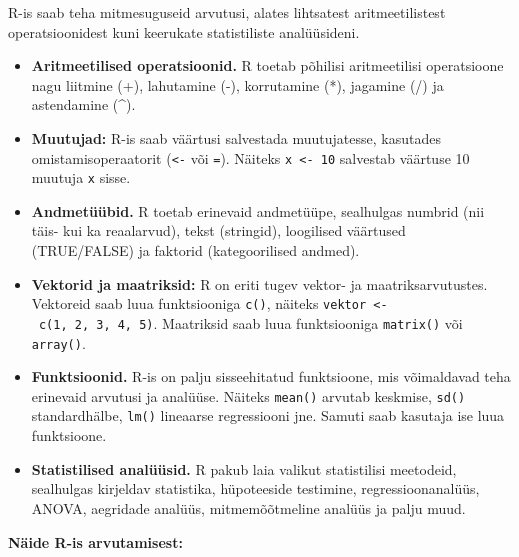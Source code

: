 \documentclass[
]{book}
\providecommand{\tightlist}{%
  \setlength{\itemsep}{0pt}\setlength{\parskip}{0pt}}
\begin{document}
R-is saab teha mitmesuguseid arvutusi, alates lihtsatest aritmeetilistest operatsioonidest kuni keerukate statistiliste analüüsideni.

\begin{itemize}
\tightlist
\item
  \textbf{Aritmeetilised operatsioonid.} R toetab põhilisi aritmeetilisi operatsioone nagu liitmine (+), lahutamine (-), korrutamine (*), jagamine (/) ja astendamine (\^{}).
\item
  \textbf{Muutujad:} R-is saab väärtusi salvestada muutujatesse, kasutades omistamisoperaatorit (\texttt{\textless{}-} või \texttt{=}). Näiteks \texttt{x\ \textless{}-\ 10} salvestab väärtuse 10 muutuja \texttt{x} sisse.
\item
  \textbf{Andmetüübid.} R toetab erinevaid andmetüüpe, sealhulgas numbrid (nii täis- kui ka reaalarvud), tekst (stringid), loogilised väärtused (TRUE/FALSE) ja faktorid (kategoorilised andmed).
\item
  \textbf{Vektorid ja maatriksid:} R on eriti tugev vektor- ja maatriksarvutustes. Vektoreid saab luua funktsiooniga \texttt{c()}, näiteks \texttt{vektor\ \textless{}-\ c(1,\ 2,\ 3,\ 4,\ 5)}. Maatriksid saab luua funktsiooniga \texttt{matrix()} või \texttt{array()}.
\item
  \textbf{Funktsioonid.} R-is on palju sisseehitatud funktsioone, mis võimaldavad teha erinevaid arvutusi ja analüüse. Näiteks \texttt{mean()} arvutab keskmise, \texttt{sd()} standardhälbe, \texttt{lm()} lineaarse regressiooni jne. Samuti saab kasutaja ise luua funktsioone.
\item
  \textbf{Statistilised analüüsid.} R pakub laia valikut statistilisi meetodeid, sealhulgas kirjeldav statistika, hüpoteeside testimine, regressioonanalüüs, ANOVA, aegridade analüüs, mitmemõõtmeline analüüs ja palju muud.
\end{itemize}

\textbf{Näide R-is arvutamisest:}
\end{document}
